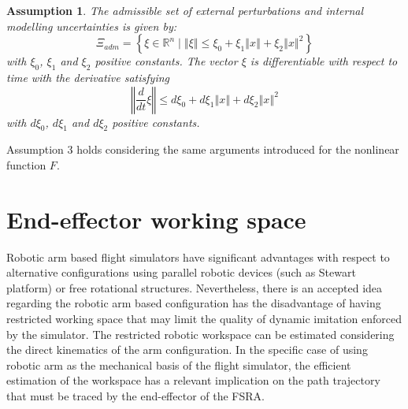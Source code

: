 \documentclass[journal,twocolumn]{IEEEtran}
\newtheorem{assumption}{Assumption}
\begin{document}
\begin{assumption}
    The admissible set of external perturbations and internal modelling uncertainties is given by:
    \begin{equation}
        \Xi_{adm} = \left\lbrace \xi \in \mathbb{R}^{n} \mid \left\Vert \xi \right\Vert \leq  \xi_{0} + \xi_{1} \left\Vert x \right\Vert + \xi_{2} \left\Vert x \right\Vert^{2} \right\rbrace
    \end{equation}
    with $\xi_0$, $\xi_1$ and $\xi_2$ positive constants. The vector $\xi$ is differentiable with respect to time with the derivative satisfying
    \begin{equation}
         \left\Vert \dfrac{d}{dt} \xi \right\Vert \leq  d\xi_{0} + d\xi_{1} \left\Vert x \right\Vert + d\xi_{2} \left\Vert x \right\Vert^{2}
    \end{equation}
    with $d\xi_0$, $d\xi_1$ and $d\xi_2$ positive constants.
\end{assumption}

Assumption 3 holds considering the same arguments introduced for the nonlinear function $F$.

\section{End-effector working space}


Robotic arm based flight simulators have significant advantages with respect to alternative configurations using parallel robotic devices (such as Stewart platform) or free rotational structures. Nevertheless, there is an accepted idea regarding the robotic arm based configuration has the disadvantage of having restricted working space that may limit the quality of dynamic imitation enforced by the simulator. The restricted robotic workspace can be estimated considering the direct kinematics of the arm configuration. In the specific case of using robotic arm as the mechanical basis of the flight simulator, the efficient estimation of the workspace has a relevant implication on the path trajectory that must be traced by the end-effector of the FSRA. 
\end{document}
